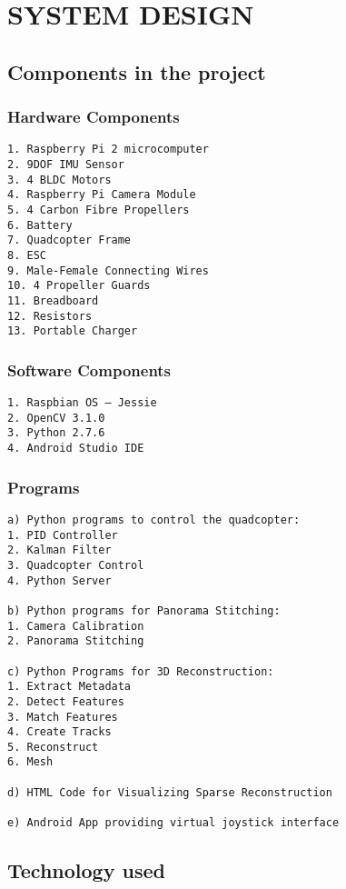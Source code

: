 \chapter{SYSTEM DESIGN} %


\section{Components in the project}
\subsection{Hardware Components}
\begin{verbatim}
1. Raspberry Pi 2 microcomputer
2. 9DOF IMU Sensor
3. 4 BLDC Motors
4. Raspberry Pi Camera Module
5. 4 Carbon Fibre Propellers
6. Battery
7. Quadcopter Frame
8. ESC
9. Male-Female Connecting Wires
10. 4 Propeller Guards
11. Breadboard
12. Resistors
13. Portable Charger
\end{verbatim}
\subsection{Software Components}
\begin{verbatim}
1. Raspbian OS – Jessie
2. OpenCV 3.1.0
3. Python 2.7.6
4. Android Studio IDE
\end{verbatim}
\subsection{Programs}
\begin{verbatim}
a) Python programs to control the quadcopter:
1. PID Controller
2. Kalman Filter
3. Quadcopter Control
4. Python Server

b) Python programs for Panorama Stitching:
1. Camera Calibration
2. Panorama Stitching

c) Python Programs for 3D Reconstruction:
1. Extract Metadata
2. Detect Features
3. Match Features
4. Create Tracks
5. Reconstruct
6. Mesh

d) HTML Code for Visualizing Sparse Reconstruction

e) Android App providing virtual joystick interface
\end{verbatim}

\section{Technology used}
